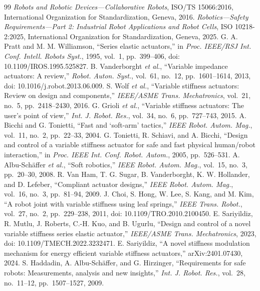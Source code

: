 \documentclass[journal]{IEEEtran}
\begin{document}
\begin{thebibliography}{99}\footnotesize
{} \emph{Robots and Robotic Devices---Collaborative Robots}, ISO/TS 15066:2016, International Organization for Standardization, Geneva, 2016.
 \emph{Robotics---Safety Requirements---Part 2: Industrial Robot Applications and Robot Cells}, ISO 10218-2:2025, International Organization for Standardization, Geneva, 2025.
 G. A. Pratt and M. M. Williamson, ``Series elastic actuators,'' in \emph{Proc. IEEE/RSJ Int. Conf. Intell. Robots Syst.}, 1995, vol.~1, pp.~399--406, doi: 10.1109/IROS.1995.525827.
 B. Vanderborght \emph{et al.}, ``Variable impedance actuators: A review,'' \emph{Robot. Auton. Syst.}, vol.~61, no.~12, pp.~1601--1614, 2013, doi: 10.1016/j.robot.2013.06.009.
 S. Wolf \emph{et al.}, ``Variable stiffness actuators: Review on design and components,'' \emph{IEEE/ASME Trans. Mechatronics}, vol.~21, no.~5, pp.~2418--2430, 2016.
 G. Grioli \emph{et al.}, ``Variable stiffness actuators: The user's point of view,'' \emph{Int. J. Robot. Res.}, vol.~34, no.~6, pp.~727--743, 2015.
 A. Bicchi and G. Tonietti, ``Fast and `soft-arm' tactics,'' \emph{IEEE Robot. Autom. Mag.}, vol.~11, no.~2, pp.~22--33, 2004.
 G. Tonietti, R. Schiavi, and A. Bicchi, ``Design and control of a variable stiffness actuator for safe and fast physical human/robot interaction,'' in \emph{Proc. IEEE Int. Conf. Robot. Autom.}, 2005, pp.~526--531.
 A. Albu-Sch\"affer \emph{et al.}, ``Soft robotics,'' \emph{IEEE Robot. Autom. Mag.}, vol.~15, no.~3, pp.~20--30, 2008.
 R. Van Ham, T. G. Sugar, B. Vanderborght, K. W. Hollander, and D. Lefeber, ``Compliant actuator designs,'' \emph{IEEE Robot. Autom. Mag.}, vol.~16, no.~3, pp.~81--94, 2009.
 J. Choi, S. Hong, W. Lee, S. Kang, and M. Kim, ``A robot joint with variable stiffness using leaf springs,'' \emph{IEEE Trans. Robot.}, vol.~27, no.~2, pp.~229--238, 2011, doi: 10.1109/TRO.2010.2100450.
 E. Sariyildiz, R. Mutlu, J. Roberts, C.-H. Kuo, and B. Ugurlu, ``Design and control of a novel variable stiffness series elastic actuator,'' \emph{IEEE/ASME Trans. Mechatronics}, 2023, doi: 10.1109/TMECH.2022.3232471.
 E. Sariyildiz, ``A novel stiffness modulation mechanism for energy efficient variable stiffness actuators,'' arXiv:2401.07430, 2024.
 S. Haddadin, A. Albu-Sch\"affer, and G. Hirzinger, ``Requirements for safe robots: Measurements, analysis and new insights,'' \emph{Int. J. Robot. Res.}, vol.~28, no.~11--12, pp.~1507--1527, 2009.

\end{thebibliography}
\end{document}

